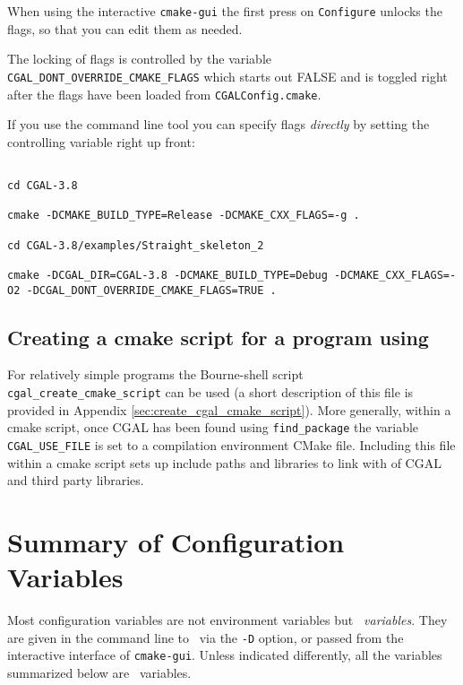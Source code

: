 When using the interactive \texttt{cmake-gui} the first press on \texttt{Configure} unlocks
the flags, so that you can edit them as needed. 

\begin{ccAdvanced}
The locking of flags is controlled by the variable {\tt CGAL\_DONT\_OVERRIDE\_CMAKE\_FLAGS}
which starts out FALSE and is toggled right after the flags have been loaded from
\texttt{CGALConfig.cmake}.

If you use the command line tool you can specify flags {\em directly} by setting the
controlling variable right up front:

{\ccTexHtml{\scriptsize}{}
\begin{verbatim}

cd CGAL-3.8

cmake -DCMAKE_BUILD_TYPE=Release -DCMAKE_CXX_FLAGS=-g .

cd CGAL-3.8/examples/Straight_skeleton_2

cmake -DCGAL_DIR=CGAL-3.8 -DCMAKE_BUILD_TYPE=Debug -DCMAKE_CXX_FLAGS=-O2 -DCGAL_DONT_OVERRIDE_CMAKE_FLAGS=TRUE . 

\end{verbatim}
}
\end{ccAdvanced}


\subsection{Creating a cmake script for a program using \cgal}

For relatively simple programs the Bourne-shell script \texttt{cgal\_create\_cmake\_script} can be used
(a short description of this file is provided in Appendix \ref{sec:create_cgal_cmake_script}).
More generally, within a cmake script, once CGAL has been found using \texttt{find\_package}
the variable \texttt{CGAL\_USE\_FILE} is set to a compilation environment CMake file. Including
this file within a cmake script sets up include paths and libraries to link with of CGAL and third party libraries.


\section{Summary of Configuration Variables}

Most configuration variables are not environment variables but {\em \cmake\ variables}. They are given in the command line to \cmake\ via the \texttt{-D} option, 
or passed from the interactive interface of \texttt{cmake-gui}. Unless
indicated differently, all the variables summarized below are \cmake\ variables.

